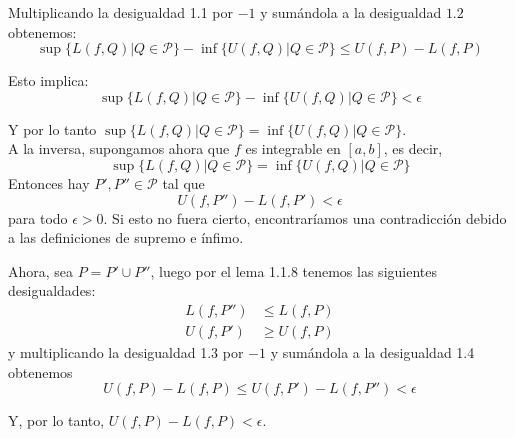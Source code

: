 \documentclass{report}
\begin{document}
    Multiplicando la desigualdad 1.1 por $-1$ y sumándola a la desigualdad $1.2$ obtenemos:
    $$
        \sup\{L(f, Q) | Q \in \mathcal{P}\} - \inf\{U(f, Q) | Q \in \mathcal{P}\} \leq U(f,P) - L(f,P)
    $$

    Esto implica:
    $$
        \sup\{L(f, Q) | Q \in \mathcal{P}\} - \inf\{U(f, Q) | Q \in \mathcal{P}\} < \epsilon
    $$

    Y por lo tanto $\sup\{L(f, Q) | Q \in \mathcal{P}\} = \inf\{U(f, Q) | Q \in \mathcal{P}\}$.\\

    A la inversa, supongamos ahora que $f$ es integrable en $[a,b]$, es decir,
    $$\sup\{L(f, Q) | Q \in \mathcal{P}\} = \inf\{U(f, Q) | Q \in \mathcal{P}\}$$
    Entonces hay $P', P'' \in \mathcal{P}$ tal que
    $$ U(f, P'') - L(f, P') < \epsilon$$
    para todo $\epsilon > 0$. Si esto no fuera cierto, encontraríamos una contradicción debido a las definiciones de supremo e ínfimo.

    Ahora, sea $P = P' \cup P''$, luego por el lema 1.1.8 tenemos las siguientes desigualdades:
    \begin{align}
        L(f, P'') &\leq L(f, P)\\
        U(f, P') &\geq U(f, P)
    \end{align}
    y multiplicando la desigualdad 1.3 por $-1$ y sumándola a la desigualdad 1.4 obtenemos
    $$U(f,P)-L(f, P) \leq U(f, P') - L(f, P'') < \epsilon$$

    Y, por lo tanto, $U(f,P)-L(f, P) < \epsilon$.
\end{document}
